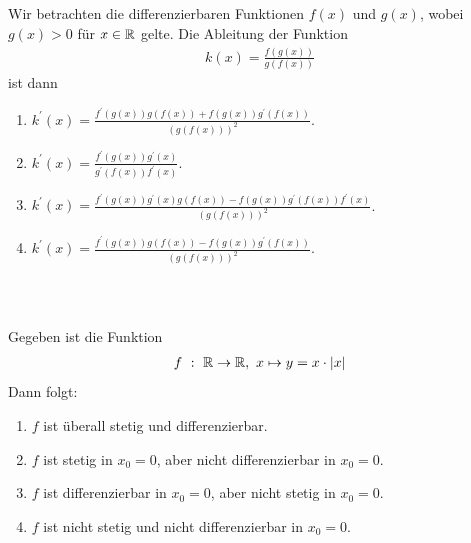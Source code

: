 \subsection*{}
Wir betrachten die differenzierbaren Funktionen $ f(x) $ und $ g(x) $, wobei $ g(x) > 0 $ für $ x \in \mathbb{R} $ gelte. Die Ableitung der Funktion
\begin{align*}
	k(x)
	=
	\frac{f(g(x))}{g(f(x))}
\end{align*}
ist dann
\renewcommand{\labelenumi}{(\alph{enumi})}
\begin{enumerate}
	\item 
	$ k^\prime(x) = \frac{f^\prime(g(x))g(f(x)) + f(g(x))g^\prime(f(x))}{(g(f(x)))^2} $.
	\item
	$ k^\prime(x) = \frac{f^\prime(g(x))g^\prime(x) }{g^\prime(f(x))f^\prime(x)} $.
	
	\item
    $ k^\prime(x) = 
    \frac{f^\prime(g(x))g^\prime(x)g(f(x)) - f(g(x)) g^\prime(f(x)) f^\prime(x) }
    {(g(f(x)))^2} $.
	\item
	$ k^\prime(x) = \frac{f^\prime(g(x))g(f(x)) - f(g(x))g^\prime(f(x))}{(g(f(x)))^2} $.
\end{enumerate}
\ \\
\subsection*{}
Gegeben ist die Funktion
\begin{align*}
	f \ : \ \mathbb{R} \rightarrow \mathbb{R}, \ x \mapsto y = x \cdot |x| 
\end{align*}
Dann folgt:
\renewcommand{\labelenumi}{(\alph{enumi})}
\begin{enumerate}
	\item 
	$ f $ ist überall stetig und differenzierbar.
	\item
	$ f $ ist stetig in $ x_0 = 0 $, aber nicht differenzierbar in $ x_0 = 0 $.
	\item
	$ f $ ist differenzierbar in $ x_0 = 0 $, aber nicht stetig in $ x_0 = 0 $.
	\item
	$ f $ ist nicht stetig und nicht differenzierbar in $ x_0 = 0 $.
\end{enumerate}
\ \\
